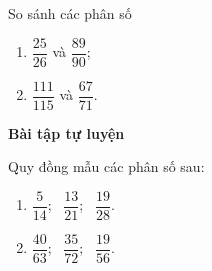 \begin{vd}%
	So sánh các phân số
	\begin{multicols}{2}
		\begin{enumerate}
			\item $ \dfrac{25}{26} $ và $ \dfrac{89}{90} $;
			\item $ \dfrac{111}{115} $ và $ \dfrac{67}{71} $.
		\end{enumerate}
	\end{multicols}
\end{vd}
\begin{center}
	\textbf{Bài tập tự luyện}
\end{center}
\begin{bt}%
	Quy đồng mẫu các phân số sau:
	\begin{multicols}{2}
		\begin{enumerate}
			\item $ \dfrac{5}{14} $; \ $ \dfrac{13}{21} $; \ $ \dfrac{19}{28} $.
			\item $ \dfrac{40}{63} $; \ $ \dfrac{35}{72} $; \ $ \dfrac{19}{56} $.
		\end{enumerate}	
	\end{multicols}
\end{bt}
